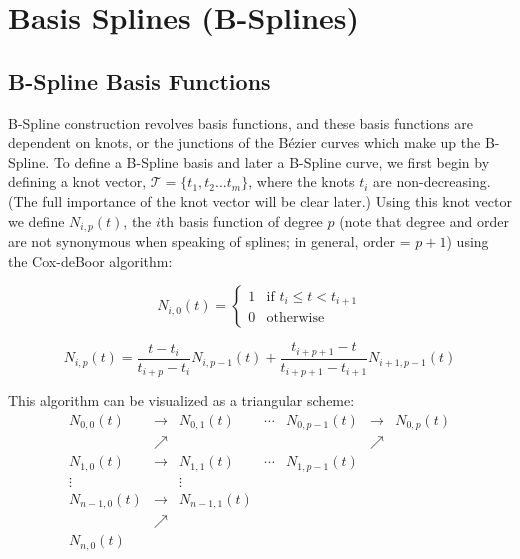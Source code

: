 \section{Basis Splines (B-Splines)}

\subsection{B-Spline Basis Functions}
B-Spline construction revolves basis functions, and these basis functions are dependent on knots, or the junctions of the Bézier curves which make up the B-Spline. To define a B-Spline basis and later a B-Spline curve, we first begin by defining a knot vector, $\mathcal{T} = \{t_1, t_2  \ldots t_{m}\}$, where the knots $t_i$ are non-decreasing.  (The full importance of the knot vector will be clear later.) Using this knot vector we define $N_{i,p}(t)$, the $i$th basis function of degree $p$ (note that degree and order are not synonymous when speaking of splines; in general, order = $p+1$) using the Cox-deBoor algorithm:

\begin{equation} 
\label{eqn:basis0}
N_{i,0}(t) = 
\begin{cases} 
1 & \text{if  } t_i \leq t < t_{i+1} \\
0 & \text{otherwise}
\end{cases} 
\end{equation}

\begin{equation}
\label{eqn:basisgeneral} 
N_{i,p}(t) = \frac{t-t_i}{t_{i+p}-t_i} N_{i,p-1}(t) + \frac{t_{i+p+1}-t}{t_{i+p+1}-t_{i+1}}N_{i+1,p-1}(t) \end{equation}

\bigskip

This algorithm can be visualized as a triangular scheme:
\begin{equation}
\begin{matrix}
	N_{0,0}(t) & \rightarrow & N_{0,1}(t) & \cdots & N_{0,p-1}(t) & \rightarrow & N_{0,p}(t)\\ 
	& \nearrow &  &  &  & \nearrow & \\ 
	N_{1,0}(t) & \rightarrow & N_{1,1}(t) & \cdots & N_{1,p-1}(t) &  & \\ 
	\vdots &  & \vdots &  &  &  & \\ 
	N_{n-1,0}(t) & \rightarrow & N_{n-1,1}(t) &  &  &  & \\ 
	& \nearrow &  &  &  &  & \\ 
	N_{n,0}(t) &  &  &  &  &  & \\ 
\end{matrix}
\end{equation}

